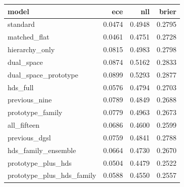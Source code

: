 \begin{tabular}{lrrr}
\toprule
model & ece & nll & brier \\
\midrule
standard & 0.0474 & 0.4948 & 0.2795 \\
matched\_flat & 0.0461 & 0.4751 & 0.2728 \\
hierarchy\_only & 0.0815 & 0.4983 & 0.2798 \\
dual\_space & 0.0874 & 0.5162 & 0.2833 \\
dual\_space\_prototype & 0.0899 & 0.5293 & 0.2877 \\
hds\_full & 0.0576 & 0.4794 & 0.2703 \\
previous\_nine & 0.0789 & 0.4849 & 0.2688 \\
prototype\_family & 0.0779 & 0.4963 & 0.2673 \\
all\_fifteen & 0.0686 & 0.4600 & 0.2599 \\
previous\_dgsl & 0.0759 & 0.4841 & 0.2788 \\
hds\_family\_ensemble & 0.0664 & 0.4730 & 0.2670 \\
prototype\_plus\_hds & 0.0504 & 0.4479 & 0.2522 \\
prototype\_plus\_hds\_family & 0.0588 & 0.4550 & 0.2557 \\
\bottomrule
\end{tabular}
